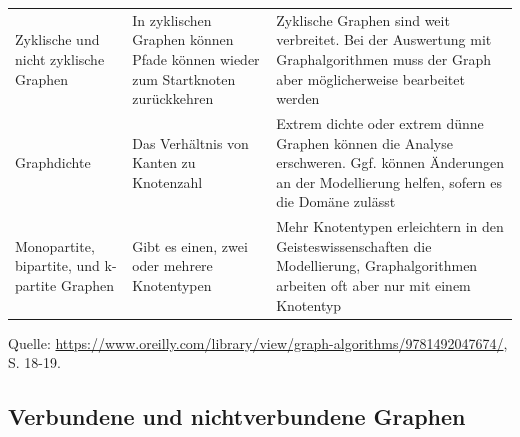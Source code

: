 \documentclass[ngerman,]{scrreprt}
\begin{document}
\begin{longtable}[]{@{}lll@{}}
\begin{minipage}[t]{0.22\columnwidth}\raggedright
Zyklische und nicht zyklische Graphen\strut
\end{minipage} & \begin{minipage}[t]{0.26\columnwidth}\raggedright
In zyklischen Graphen können Pfade können wieder zum Startknoten zurückkehren\strut
\end{minipage} & \begin{minipage}[t]{0.44\columnwidth}\raggedright
Zyklische Graphen sind weit verbreitet. Bei der Auswertung mit Graphalgorithmen muss der Graph aber möglicherweise bearbeitet werden\strut
\end{minipage}\tabularnewline
\begin{minipage}[t]{0.22\columnwidth}\raggedright
Graphdichte\strut
\end{minipage} & \begin{minipage}[t]{0.26\columnwidth}\raggedright
Das Verhältnis von Kanten zu Knotenzahl\strut
\end{minipage} & \begin{minipage}[t]{0.44\columnwidth}\raggedright
Extrem dichte oder extrem dünne Graphen können die Analyse erschweren. Ggf. können Änderungen an der Modellierung helfen, sofern es die Domäne zulässt\strut
\end{minipage}\tabularnewline
\begin{minipage}[t]{0.22\columnwidth}\raggedright
Monopartite, bipartite, und k-partite Graphen\strut
\end{minipage} & \begin{minipage}[t]{0.26\columnwidth}\raggedright
Gibt es einen, zwei oder mehrere Knotentypen\strut
\end{minipage} & \begin{minipage}[t]{0.44\columnwidth}\raggedright
Mehr Knotentypen erleichtern in den Geisteswissenschaften die Modellierung, Graphalgorithmen arbeiten oft aber nur mit einem Knotentyp\strut
\end{minipage}\tabularnewline
\bottomrule
\end{longtable}

Quelle: \href{Needham/Hodler\%202019}{https://www.oreilly.com/library/view/graph-algorithms/9781492047674/}, S. 18-19.

\hypertarget{verbundene-und-nichtverbundene-graphen}{%
\subsection{Verbundene und nichtverbundene Graphen}\label{verbundene-und-nichtverbundene-graphen}}
\end{document}

